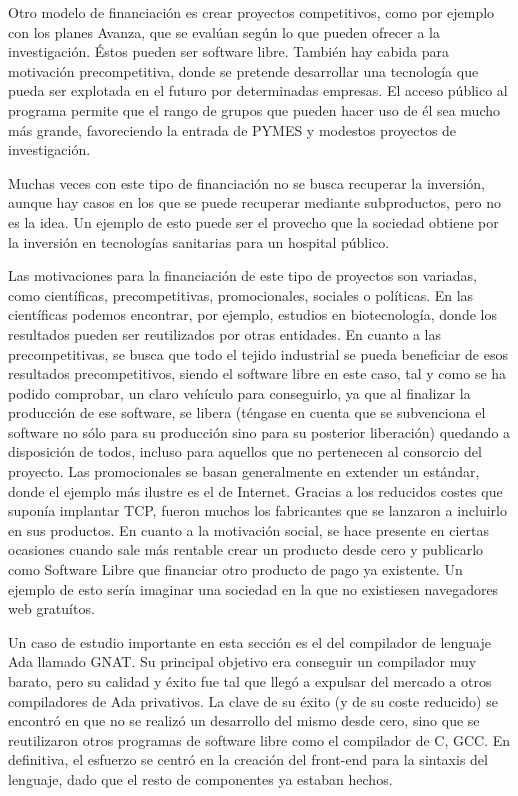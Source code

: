 Otro modelo de financiación es crear proyectos competitivos, como por ejemplo
con los planes Avanza, que se evalúan según lo que pueden ofrecer a la
investigación. Éstos pueden ser software libre.
También hay cabida para motivación precompetitiva, donde se
pretende desarrollar una tecnología que pueda ser explotada en el
futuro por determinadas empresas. El acceso público al programa
permite que el rango de grupos que pueden hacer uso de él sea mucho
más grande, favoreciendo la entrada de PYMES y modestos proyectos de
investigación.

Muchas veces con este tipo de financiación no se busca recuperar la inversión,
aunque hay casos en los que se puede recuperar mediante subproductos, pero no
es la idea.
Un ejemplo de esto puede ser el provecho que la sociedad obtiene por
la inversión en tecnologías sanitarias para un hospital público.

Las motivaciones para la financiación de este tipo de proyectos son variadas,
como científicas, precompetitivas, promocionales, sociales o políticas.
En las científicas podemos encontrar, por ejemplo, estudios en
biotecnología, donde los resultados pueden ser reutilizados por otras
entidades. En cuanto a las precompetitivas, se busca que todo el tejido
industrial se pueda beneficiar de esos resultados precompetitivos, siendo el
software libre en este caso, tal y como se ha podido comprobar, un claro
vehículo para conseguirlo, ya que al finalizar la producción de ese software,
se libera (téngase en cuenta que se subvenciona el software no sólo para su
producción sino para su posterior liberación) quedando a disposición de
todos, incluso para aquellos que no pertenecen al consorcio del proyecto. Las
promocionales se basan generalmente en extender un estándar, donde el ejemplo
más ilustre es el de Internet. Gracias a los reducidos costes que suponía
implantar TCP, fueron muchos los fabricantes que se lanzaron a incluirlo en sus
productos. En cuanto a la motivación social, se hace presente en ciertas
ocasiones cuando sale más rentable crear un producto desde cero y publicarlo
como Software Libre que financiar otro producto de pago ya existente. Un
ejemplo de esto sería imaginar una sociedad en la que no existiesen
navegadores web gratuítos.

Un caso de estudio importante en esta sección es el del compilador de lenguaje
Ada llamado GNAT. Su principal objetivo era conseguir un compilador muy barato,
pero su calidad y éxito fue tal que llegó a expulsar del mercado a otros
compiladores de Ada privativos. La clave de su éxito (y de su coste
reducido) se encontró en que no se realizó un desarrollo del mismo desde cero,
sino que se reutilizaron otros programas de software libre como el compilador
de C, GCC. En definitiva, el esfuerzo se centró en la creación del front-end
para la sintaxis del lenguaje, dado que el resto de componentes ya estaban
hechos.

